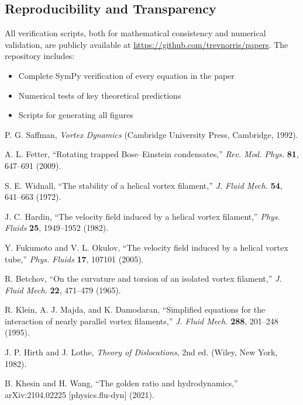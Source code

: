 \subsection{Reproducibility and Transparency}
All verification scripts, both for mathematical consistency and numerical validation, are publicly available at \url{https://github.com/trevnorris/papers}. The repository includes:
\begin{itemize}
\item Complete SymPy verification of every equation in the paper
\item Numerical tests of key theoretical predictions
\item Scripts for generating all figures
\end{itemize}

\begin{thebibliography}{99}

P. G. Saffman,
\emph{Vortex Dynamics}
(Cambridge University Press, Cambridge, 1992).

A. L. Fetter,
``Rotating trapped Bose–Einstein condensates,''
\emph{Rev. Mod. Phys.} \textbf{81}, 647--691 (2009).

S. E. Widnall,
``The stability of a helical vortex filament,''
\emph{J. Fluid Mech.} \textbf{54}, 641--663 (1972).

J. C. Hardin,
``The velocity field induced by a helical vortex filament,''
\emph{Phys. Fluids} \textbf{25}, 1949--1952 (1982).

Y. Fukumoto and V. L. Okulov,
``The velocity field induced by a helical vortex tube,''
\emph{Phys. Fluids} \textbf{17}, 107101 (2005).

R. Betchov,
``On the curvature and torsion of an isolated vortex filament,''
\emph{J. Fluid Mech.} \textbf{22}, 471--479 (1965).

R. Klein, A. J. Majda, and K. Damodaran,
``Simplified equations for the interaction of nearly parallel vortex filaments,''
\emph{J. Fluid Mech.} \textbf{288}, 201--248 (1995).

J. P. Hirth and J. Lothe,
\emph{Theory of Dislocations}, 2nd ed.
(Wiley, New York, 1982).

B. Khesin and H. Wang,
``The golden ratio and hydrodynamics,''
arXiv:2104.02225 [physics.flu-dyn] (2021).


\end{thebibliography}
